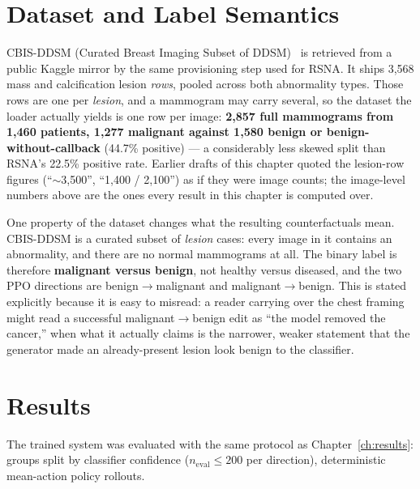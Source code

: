 \section{Dataset and Label Semantics}
\label{sec:breast_semantics}

CBIS-DDSM (Curated Breast Imaging Subset of DDSM)~\cite{lee2017cbisddsm} is
retrieved from a public Kaggle mirror by the same provisioning step used
for RSNA. It ships 3{,}568 mass and calcification lesion
\emph{rows}, pooled across both abnormality types. Those rows are one per
\emph{lesion}, and a mammogram may carry several, so the dataset the loader
actually yields is one row per image: \textbf{2{,}857 full mammograms from
1{,}460 patients, 1{,}277 malignant against 1{,}580 benign or
benign-without-callback} (44.7\% positive) --- a considerably less skewed
split than RSNA's 22.5\% positive rate. Earlier drafts of this chapter
quoted the lesion-row figures (``$\sim$3{,}500'', ``1{,}400 / 2{,}100'') as
if they were image counts; the image-level numbers above are the ones every
result in this chapter is computed over.

One property of the dataset changes what the resulting counterfactuals mean.
CBIS-DDSM is a curated subset of \emph{lesion} cases: every image in it
contains an abnormality, and there are no normal mammograms at all. The
binary label is therefore \textbf{malignant versus benign}, not
healthy versus diseased, and the two PPO directions are
benign$\to$malignant and malignant$\to$benign. This is stated explicitly
because it is easy to misread: a reader carrying over the chest framing
might read a successful malignant$\to$benign edit as ``the model removed
the cancer,'' when what it actually claims is the narrower, weaker
statement that the generator made an already-present lesion look benign to
the classifier.

\section{Results}
\label{sec:breast_results}

The trained system was evaluated with the same protocol as
Chapter~\ref{ch:results}: groups split by classifier confidence
($n_{\text{eval}} \le 200$ per direction), deterministic mean-action policy
rollouts.

